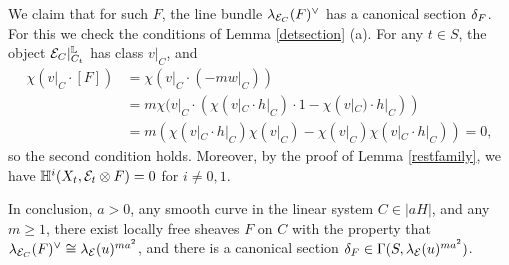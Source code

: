 \documentclass[letterpaper,11pt]{amsart}%
\theoremstyle{remark}
\begin{document}
We claim that for such $F$, the line bundle $\lambda_{\mathcal{E}_C}(F)^\vee$ has a canonical section $\delta_F$. For this we check the conditions of Lemma \ref{detsection} (a). For any $t \in S$, the object $\mathcal{E}_C|_{C_t}^{\mathbb{L}}$ has class $v|_C$, and
\begin{align*} 
    \chi(v|_C \cdot [F]) & = \chi(v|_C \cdot (-m w|_C)) \\
    &= m \chi(v|_C \cdot(\chi(v|_C \cdot h|_C) \cdot 1 - \chi(v|_C) \cdot h|_C)) \\
    & = m (\chi(v|_C \cdot h|_C) \chi(v|_C)  - \chi(v|_C) \chi(v|_C \cdot h|_C)) = 0,
\end{align*}
so the second condition holds. Moreover, by the proof of Lemma \ref{restfamily}, we have $\mathbb{H}^i(X_t, \mathcal{E}_t \otimes F) = 0$ for $i \neq 0,1$. 

In conclusion, $a > 0$, any smooth curve in the linear system $C \in |aH|$, and any $m \ge 1$, there exist locally free sheaves $F$ on $C$ with the property that $\lambda_{\mathcal{E}_C}(F)^\vee \cong \lambda_{\mathcal{E}}(u)^{m a^2}$, and there is a canonical section $\delta_F \in \Gamma(S, \lambda_{\mathcal{E}}(u)^{m a^2})$. 
\end{document}
